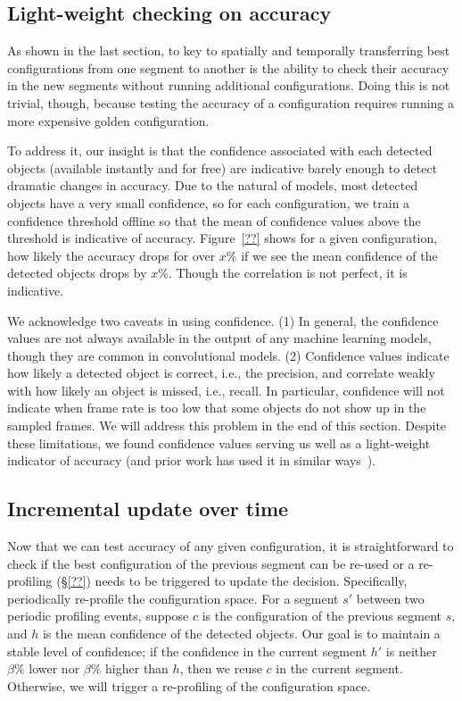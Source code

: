 \subsection{Light-weight checking on accuracy}
As shown in the last section, to key to spatially and temporally 
transferring best configurations from one segment to another is 
the ability to check their accuracy in the new segments without
running additional configurations.
Doing this is not trivial, though, because testing the accuracy of
a configuration requires running a more expensive golden 
configuration.

To address it, our insight is that the confidence associated with
each detected objects (available instantly and for free) are 
indicative barely enough to detect dramatic changes in accuracy.
Due to the natural of \nn models, most detected objects have a 
very small confidence, so for each configuration, we train a 
confidence threshold offline so that the mean of confidence values 
above the threshold is indicative of accuracy.
Figure~\ref{??} shows for a given configuration, how likely the
accuracy drops for over $x\%$ if we see the mean confidence of
the detected objects drops by $x\%$. 
Though the correlation is not perfect, it is indicative.

We acknowledge two caveats in using confidence. 
(1) In general, the confidence values are not always available 
in the output of any machine learning models, though they are 
common in convolutional \nn models.
(2) Confidence values indicate how likely a detected object
is correct, i.e., the precision, and correlate weakly with how 
likely an object is missed, i.e., recall.
In particular, confidence will not indicate when frame rate is
too low that some objects do not show up in the sampled frames.
We will address this problem in the end of this section.
Despite these limitations, we found confidence values serving us
well as a light-weight indicator of accuracy (and prior work has
used it in similar ways~\cite{noscope}).


\subsection{Incremental update over time}
Now that we can test accuracy of any given configuration, it is
straightforward to check if the best configuration of the 
previous segment can be re-used or a re-profiling (\S\ref{??})
needs to be triggered to update the decision.
Specifically, \name periodically re-profile the configuration 
space. 
For a segment $s'$ between two periodic profiling events, 
suppose $c$ is the configuration of the previous
segment $s$, and $h$ is the mean confidence of the detected 
objects. 
Our goal is to maintain a stable level of confidence; if the 
confidence in the current segment $h'$ is neither $\beta\%$ lower 
nor $\beta\%$ higher than $h$, then we reuse $c$ in the current
segment. 
Otherwise, we will trigger a re-profiling of the configuration 
space.

